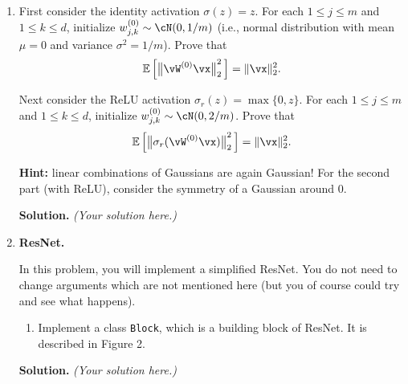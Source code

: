 \documentclass{article}
\theoremstyle{definition}
\theoremstyle{remark}
\newenvironment{Q}
{%
\clearpage
\item
}
{%
\phantom{s}
\bigskip
\textbf{Solution.}
\emph{(Your solution here.)}
}
\begin{document}
\begin{enumerate}
\begin{Q}
\begin{enumerate}
        First consider the identity activation $\sigma(z)=z$. For each $1\le j\le m$ and $1\le k\le d$, initialize $w_{j,k}^{(0)}\sim\cN(0,1/m)$ (i.e., normal distribution with mean $\mu=0$ and variance $\sigma^2=1/m$).
        Prove that
        \begin{align*}
            \mathbb{E}\sbr[2]{\,\enVert[1]{\vW^{(0)}\vx}_2^2\,}=\|\vx\|_2^2.
        \end{align*}

        Next consider the ReLU activation $\sigma_r(z)=\max\{0,z\}$. For each $1\le j\le m$ and $1\le k\le d$, initialize $w_{j,k}^{(0)}\sim\cN(0,2/m)$. Prove that
        \begin{align*}
            \mathbb{E}\sbr[2]{\,\enVert[1]{\sigma_r(\vW^{(0)}\vx)}_2^2\,}=\|\vx\|_2^2.
        \end{align*}

        \textbf{Hint:} linear combinations of Gaussians are again Gaussian!
        For the second part (with ReLU), consider the symmetry of a Gaussian around 0.
    \end{enumerate}
\end{Q}

\begin{Q}
    \textbf{ResNet.}

    In this problem, you will implement a simplified ResNet. You do not need to change arguments which are not mentioned here (but you of course could try and see what happens).
    \begin{enumerate}
        \item Implement a class \texttt{Block}, which is a building block of ResNet. It is described in \citep{resnet} Figure 2.


\end{enumerate}
\end{Q}
\end{enumerate}
\end{document}
